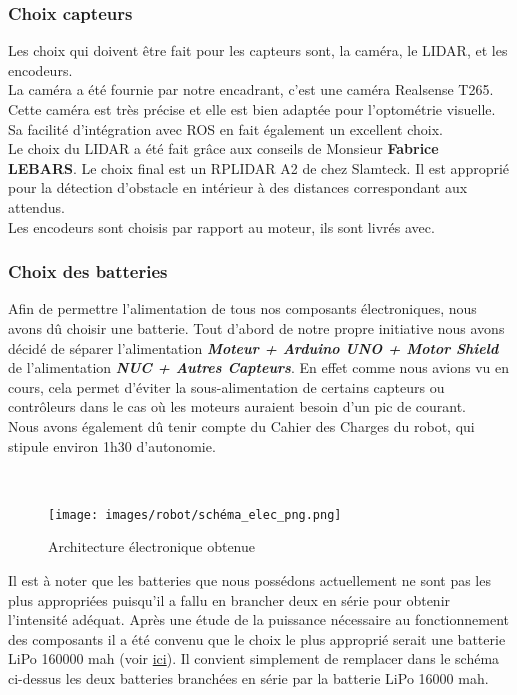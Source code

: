\documentclass[french]{rapportENSTAB}
\begin{document}
\subsubsection{Choix capteurs}

Les choix qui doivent être fait pour les capteurs sont, la caméra, le LIDAR, et les encodeurs. \\
La caméra a été fournie par notre encadrant, c'est une caméra Realsense T265. Cette caméra est très précise et elle est bien adaptée pour l'optométrie visuelle. Sa facilité d'intégration avec ROS en fait également un excellent choix.\\
Le choix du LIDAR a été fait grâce aux conseils de Monsieur \textbf{Fabrice LEBARS}. Le choix final est un RPLIDAR A2 de chez Slamteck. Il est approprié pour la détection d'obstacle en intérieur à des distances correspondant aux attendus.\\
Les encodeurs sont choisis par rapport au moteur, ils sont livrés avec.




\subsubsection{Choix des batteries}
Afin de permettre l'alimentation de tous nos composants électroniques, nous avons dû choisir une batterie. Tout d'abord de notre propre initiative nous avons décidé de séparer l'alimentation \textit{\textbf{Moteur + Arduino UNO + Motor Shield}} de l'alimentation \textit{\textbf{NUC + Autres Capteurs}}. En effet comme nous avions vu en cours, cela permet d'éviter la sous-alimentation de certains capteurs ou contrôleurs dans le cas où les moteurs auraient besoin d'un pic de courant.\\
Nous avons également dû tenir compte du Cahier des Charges du robot, qui stipule environ 1h30 d'autonomie.

\\

 \begin{figure}[H]
    \centering
    \texttt{[image: images/robot/schéma\_elec\_png.png]}
    \caption{Architecture électronique obtenue}
    \label{fig:cdcf}
\end{figure}


Il est à noter que les batteries que nous possédons actuellement ne sont pas les plus appropriées puisqu'il a fallu en brancher deux en série pour obtenir l'intensité adéquat. Après une étude de la puissance nécessaire au fonctionnement des composants il a été convenu que le choix le plus approprié serait une batterie LiPo 160000 mah (voir  \href{https://www.iplanes-rc.fr/produit/batterie-lipo-22-2-volt-16000mah-25c/}{ici}).
Il convient simplement de remplacer dans le schéma ci-dessus les deux batteries branchées en série par la batterie LiPo 16000 mah.
\end{document}
